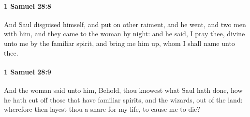 		\paragraph{1 Samuel 28:8} %
			\label{1SAMUEL-28-8}

			And Saul disguised himself, and put on other raiment, and he went, and two men with him, and they came to the woman by night: and he said, I pray thee, divine unto me by the familiar spirit, and bring me him up, whom I shall name unto thee.


		\paragraph{1 Samuel 28:9} %
			\label{1SAMUEL-28-9}

			And the woman said unto him, Behold, thou knowest what Saul hath done, how he hath cut off those that have familiar spirits, and the wizards, out of the land: wherefore then layest thou a snare for my life, to cause me to die?

